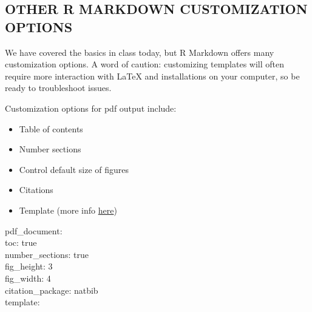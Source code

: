 \documentclass[
]{article}
\providecommand{\tightlist}{%
  \setlength{\itemsep}{0pt}\setlength{\parskip}{0pt}}
\begin{document}
\hypertarget{other-r-markdown-customization-options}{%
\subsection{OTHER R MARKDOWN CUSTOMIZATION
OPTIONS}\label{other-r-markdown-customization-options}}

We have covered the basics in class today, but R Markdown offers many
customization options. A word of caution: customizing templates will
often require more interaction with LaTeX and installations on your
computer, so be ready to troubleshoot issues.

Customization options for pdf output include:

\begin{itemize}
\tightlist
\item
  Table of contents
\item
  Number sections
\item
  Control default size of figures
\item
  Citations
\item
  Template (more info
  \href{http://jianghao.wang/post/2017-12-08-rmarkdown-templates/}{here})
\end{itemize}

pdf\_document:\\
toc: true\\
number\_sections: true\\
fig\_height: 3\\
fig\_width: 4\\
citation\_package: natbib\\
template:
\end{document}
